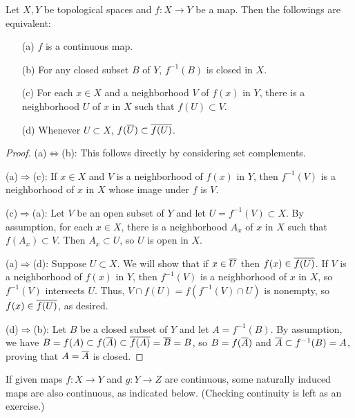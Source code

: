 \begin{thm}
    Let $X, Y$ be topological spaces and $f: X\rightarrow Y$ be a map.
    Then the followings are equivalent:
    \begin{enumerate}
        \item[(a)]
        {
            $f$ is a continuous map.
        }
        \item[(b)]
        {
            For any closed subset $B$ of $Y$, $f^{-1}(B)$ is closed in $X$.
        }
        \item[(c)]
        {
            For each $x\in X$ and a neighborhood $V$ of $f(x)$ in $Y$, there is a neighborhood $U$ of $x$ in $X$ such that $f(U)\subset V$.
        }
        \item[(d)]
        {
            Whenever $U\subset X$, $f(\overline{U})\subset\overline{f(U)}$.
        }
    \end{enumerate}
\end{thm}
\begin{proof}
    \hangindent=0.65cm
    (a)$\Leftrightarrow$(b):
        This follows directly by considering set complements.

    \noindent(a)$\Rightarrow$(c):
        If $x\in X$ and $V$ is a neighborhood of $f(x)$ in $Y$, then $f^{-1}(V)$ is a neighborhood of $x$ in $X$ whose image under $f$ is $V$.
    
    \noindent(c)$\Rightarrow$(a):
        Let $V$ be an open subset of $Y$ and let $U=f^{-1}(V)\subset X$.
        By assumption, for each $x\in X$, there is a neighborhood $A_x$ of $x$ in $X$ such that $f(A_x)\subset V$.
        Then $A_x\subset U$, so $U$ is open in $X$.
    
    \noindent(a)$\Rightarrow$(d):
        Suppose $U\subset X$.
        We will show that if $x\in\overline{U}$ then $f(x)\in\overline{f(U)}$.
        If $V$ is a neighborhood of $f(x)$ in $Y$, then $f^{-1}(V)$ is a neighborhood of $x$ in $X$, so $f^{-1}(V)$ intersects $U$.
        Thus, $V\cap f(U)=f(f^{-1}(V)\cap U)$ is nonempty, so $f(x)\in\overline{f(U)}$, as desired.

    \noindent(d)$\Rightarrow$(b):
        Let $B$ be a closed subset of $Y$ and let $A=f^{-1}(B)$.
        By assumption, we have $B=f(A)\subset f(\overline{A})\subset \overline{f(A)}=\overline{B}=B$, so $B=f(\overline{A})$ and $\overline{A}\subset f^{-1}(B)=A$, proving that $A=\overline{A}$ is closed.
\end{proof}

If given maps $f: X\rightarrow Y$ and $g: Y\rightarrow Z$ are continuous, some naturally induced maps are also continuous, as indicated below. \color{brown}(Checking continuity is left as an exercise.)\color{black}

